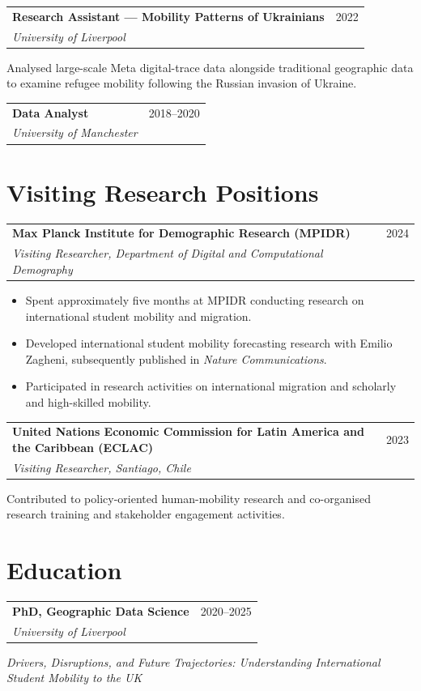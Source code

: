 \documentclass[a4paper,10.5pt]{article}
\makeatletter
\newcommand{\cventry}[3]{%
  \vspace{3.5pt}
  \begin{tabular*}{\textwidth}
    {@{}p{0.80\textwidth}@{\extracolsep{\fill}}r@{}}
    {\small\textbf{#1}} &
    {\small\color{mutedtext} #3} \\[-0.5pt]
    {\small\textit{#2}} &
  \end{tabular*}
  \vspace{1pt}
}
\newcommand{\compactentry}[3]{%
  \vspace{3pt}
  \begin{tabular*}{\textwidth}
    {@{}p{0.80\textwidth}@{\extracolsep{\fill}}r@{}}
    {\small\textbf{#1}} &
    {\small\color{mutedtext} #3} \\[-0.5pt]
    {\small\textit{#2}} &
  \end{tabular*}
  \vspace{0.5pt}
}
\newcommand{\cvbullet}[1]{%
  \item {\small #1}
}
\makeatother
\begin{document}
\compactentry
{Research Assistant --- Mobility Patterns of Ukrainians}
{University of Liverpool}
{2022}

{\small
Analysed large-scale Meta digital-trace data alongside traditional geographic
data to examine refugee mobility following the Russian invasion of Ukraine.
}

\compactentry
{Data Analyst}
{University of Manchester}
{2018--2020}

\section{Visiting Research Positions}

\cventry
{Max Planck Institute for Demographic Research (MPIDR)}
{Visiting Researcher, Department of Digital and Computational Demography}
{2024}

\begin{itemize}
  \cvbullet{Spent approximately five months at MPIDR conducting research on international student mobility and migration.}
  \cvbullet{Developed international student mobility forecasting research with Emilio Zagheni, subsequently published in \textit{Nature Communications}.}
  \cvbullet{Participated in research activities on international migration and scholarly and high-skilled mobility.}
\end{itemize}

\cventry
{United Nations Economic Commission for Latin America and the Caribbean (ECLAC)}
{Visiting Researcher, Santiago, Chile}
{2023}

{\small
Contributed to policy-oriented human-mobility research and co-organised
research training and stakeholder engagement activities.
}

\section{Education}

\cventry
{PhD, Geographic Data Science}
{University of Liverpool}
{2020--2025}

{\small
\textit{Drivers, Disruptions, and Future Trajectories:
Understanding International Student Mobility to the UK}
}

\vspace{1.5pt}
\end{document}
